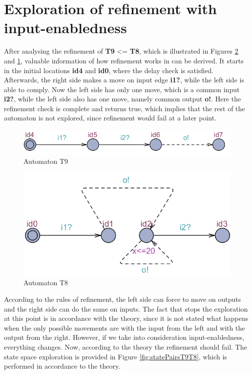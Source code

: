 \section{Exploration of refinement with input-enabledness}\label{sec:case2}
After analysing the refinement of \textbf{T9} <= \textbf{T8}, which is illustrated in Figures \ref{fig:T8} and \ref{fig:T9}, valuable information of how refinement works in \ecdar can be derived. It starts in the initial locations \textbf{id4} and \textbf{id0}, where the delay check is satisfied. Afterwards, the right side makes a move on input edge \textbf{i1?}, while the left side is able to comply. Now the left side has only one move, which is a common input \textbf{i2?}, while the left side also has one move, namely common output \textbf{o!}. Here the refinement check is complete and \ecdar returns true, which implies that the rest of the automaton is not explored, since refinement would fail at a later point.
\begin{figure}
    \centering
    \includegraphics[scale = 0.7]{figures/T9.png}
    \caption{Automaton T9}
    \label{fig:T9}
\end{figure}
\begin{figure}
    \centering
    \includegraphics[scale = 0.7]{figures/T8.png}
    \caption{Automaton T8}
    \label{fig:T8}
\end{figure}
According to the rules of refinement, the left side can force to move on outputs and the right side can do the same on inputs. The fact that \ecdar stops the exploration at this point is in accordance with the theory, since it is not stated what happens when the only possible movements are with the input from the left and with the output from the right. However, if we take into consideration input-enabledness, everything changes. Now, according to the theory the refinement should fail. The state space exploration is provided in Figure \ref{fig:statePairsT9T8}, which is performed in accordance to the theory.

